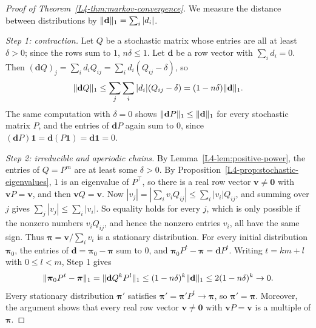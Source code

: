 \begin{proof}[Proof of Theorem~\ref{L4-thm:markov-convergence}]
    We measure the distance between distributions by $\lVert \mathbf{d} \rVert_1 = \sum_i |d_i|$.

    \emph{Step 1: contraction.} Let $Q$ be a stochastic matrix whose entries are all at least $\delta > 0$; since the rows sum to $1$, $n\delta \leq 1$. Let $\mathbf{d}$ be a row vector with $\sum_i d_i = 0$. Then $(\mathbf{d}Q)_j = \sum_i d_iQ_{ij} = \sum_i d_i(Q_{ij} - \delta)$, so
    \[\lVert \mathbf{d}Q \rVert_1 \leq \sum_j \sum_i |d_i|(Q_{ij} - \delta) = (1 - n\delta)\lVert \mathbf{d} \rVert_1.\]
    The same computation with $\delta = 0$ shows $\lVert \mathbf{d}P \rVert_1 \leq \lVert \mathbf{d} \rVert_1$ for every stochastic matrix $P$, and the entries of $\mathbf{d}P$ again sum to $0$, since $(\mathbf{d}P)\mathbf{1} = \mathbf{d}(P\mathbf{1}) = \mathbf{d}\mathbf{1} = 0$.

    \emph{Step 2: irreducible and aperiodic chains.} By Lemma~\ref{L4-lem:positive-power}, the entries of $Q = P^m$ are at least some $\delta > 0$. By Proposition~\ref{L4-prop:stochastic-eigenvalues}, $1$ is an eigenvalue of $P^\top$, so there is a real row vector $\mathbf{v} \neq \mathbf{0}$ with $\mathbf{v}P = \mathbf{v}$, and then $\mathbf{v}Q = \mathbf{v}$. Now $|v_j| = |\sum_i v_iQ_{ij}| \leq \sum_i |v_i|Q_{ij}$, and summing over $j$ gives $\sum_j |v_j| \leq \sum_i |v_i|$. So equality holds for every $j$, which is only possible if the nonzero numbers $v_iQ_{ij}$, and hence the nonzero entries $v_i$, all have the same sign. Thus $\boldsymbol{\pi} = \mathbf{v}/\sum_i v_i$ is a stationary distribution. For every initial distribution $\boldsymbol{\pi}_0$, the entries of $\mathbf{d} = \boldsymbol{\pi}_0 - \boldsymbol{\pi}$ sum to $0$, and $\boldsymbol{\pi}_0P^t - \boldsymbol{\pi} = \mathbf{d}P^t$. Writing $t = km + l$ with $0 \leq l < m$, Step 1 gives
    \[\lVert \boldsymbol{\pi}_0P^t - \boldsymbol{\pi} \rVert_1 = \lVert \mathbf{d}Q^kP^l \rVert_1 \leq (1 - n\delta)^k\lVert \mathbf{d} \rVert_1 \leq 2(1 - n\delta)^k \to 0.\]
    Every stationary distribution $\boldsymbol{\pi}'$ satisfies $\boldsymbol{\pi}' = \boldsymbol{\pi}'P^t \to \boldsymbol{\pi}$, so $\boldsymbol{\pi}' = \boldsymbol{\pi}$. Moreover, the argument shows that every real row vector $\mathbf{v} \neq \mathbf{0}$ with $\mathbf{v}P = \mathbf{v}$ is a multiple of $\boldsymbol{\pi}$.


\end{proof}
